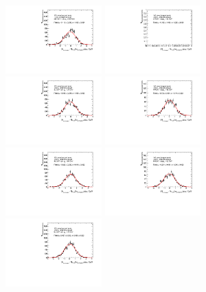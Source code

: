 \begin{figure}
\includegraphics[width=0.33\textwidth]{fig/UnfoldPull/SingleSlicePull16.pdf}
\includegraphics[width=0.33\textwidth]{fig/UnfoldPull/SingleSlicePull17.pdf}
\includegraphics[width=0.33\textwidth]{fig/UnfoldPull/SingleSlicePull18.pdf}
%
\includegraphics[width=0.33\textwidth]{fig/UnfoldPull/SingleSlicePull20.pdf}
\includegraphics[width=0.33\textwidth]{fig/UnfoldPull/SingleSlicePull21.pdf}
\includegraphics[width=0.33\textwidth]{fig/UnfoldPull/SingleSlicePull22.pdf}
%
\includegraphics[width=0.33\textwidth]{fig/UnfoldPull/SingleSlicePull23.pdf}

\end{figure}
